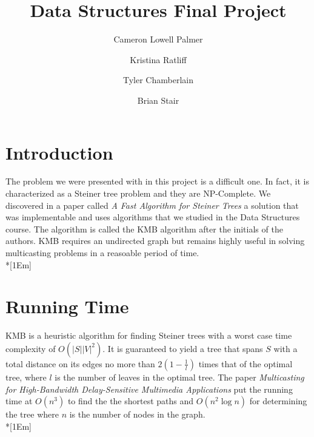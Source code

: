 \documentclass[titlepage,twoside,openright,12pt]{article}
\title{Data Structures Final Project}
\author{Cameron Lowell Palmer \and Kristina Ratliff \and Tyler Chamberlain \and Brian Stair}
\begin{document}
\maketitle

\begin{raggedright}

\section*{Introduction}
The problem we were presented with in this project is a difficult one. In fact, it
is characterized as a Steiner tree problem and they are NP-Complete. We discovered
in a paper called \textit{A Fast Algorithm for Steiner Trees}\cite{ks:kmb} a solution that
was implementable and uses algorithms that we studied in the Data Structures course. 
The algorithm is called the KMB algorithm after the initials of the authors. KMB
requires an undirected graph but remains highly useful in solving multicasting 
problems in a reasoable period of time.\\*[1Em]

\section*{Running Time}
KMB is a heuristic algorithm for finding Steiner trees with a worst case time
complexity of $O(|S||V|^{2})$. It is guaranteed to yield a tree that spans $S$ with a
total distance on its edges no more than $2(1 - \frac{1}{l})$ times that of the optimal
tree, where $l$ is the number of leaves in the optimal tree. The paper \textit{Multicasting
for High-Bandwidth Delay-Sensitive Multimedia Applications}\cite{ks:kpp} put the
running time at $O(n^{3})$ to find the the shortest paths and $O(n^{2} \log n)$ for
determining the tree where $n$ is the number of nodes in the graph.\\*[1Em]


\end{raggedright}
\end{document}
